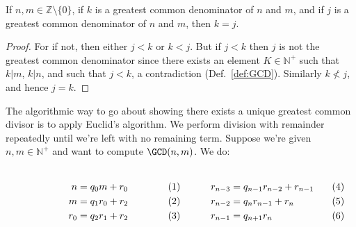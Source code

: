 \documentclass{article}                                                        %
\begin{document}
            \begin{theorem}
                \label{thm:GCD_Unique}%
                If $n,m\in\mathbb{Z}\setminus\{0\}$, if $k$ is a greatest common
                denominator of $n$ and $m$, and if $j$ is a greatest common
                denominator of $n$ and $m$, then $k=j$.
            \end{theorem}
            \begin{proof}
                For if not, then either $j<k$ or $k<j$. But if $j<k$ then $j$ is
                not the greatest common denominator since there exists an element
                $K\in\mathbb{N}^{+}$ such that $k|m$, $k|n$, and such that
                $j<k$, a contradiction (Def.~\ref{def:GCD}). Similarly $k\not<j$,
                and hence $j=k$.
            \end{proof}
            The algorithmic way to go about showing there exists a unique greatest
            common divisor is to apply Euclid's algorithm. We perform division with
            remainder repeatedly until we're left with no remaining term. Suppose
            we're given $n,m\in\mathbb{N}^{+}$ and want to compute
            $\GCD(n,m)$. We do:
            \par
            \begin{subequations}
                \begin{minipage}[b]{0.49\textwidth}
                    \centering
                    \begin{align}
                        n&=q_{0}m+r_{0}\\
                        m&=q_{1}r_{0}+r_{2}\\
                        r_{0}&=q_{2}r_{1}+r_{2}
                    \end{align}
                \end{minipage}
                \hfill
                \begin{minipage}[b]{0.49\textwidth}
                    \centering
                    \begin{align}
                        r_{n-3}&=q_{n-1}r_{n-2}+r_{n-1}\\
                        r_{n-2}&=q_{n}r_{n-1}+r_{n}\\
                        r_{n-1}&=q_{n+1}r_{n}
                    \end{align}
                \end{minipage}
            \end{subequations}
            \par\vspace{2.5ex}
\end{document}
